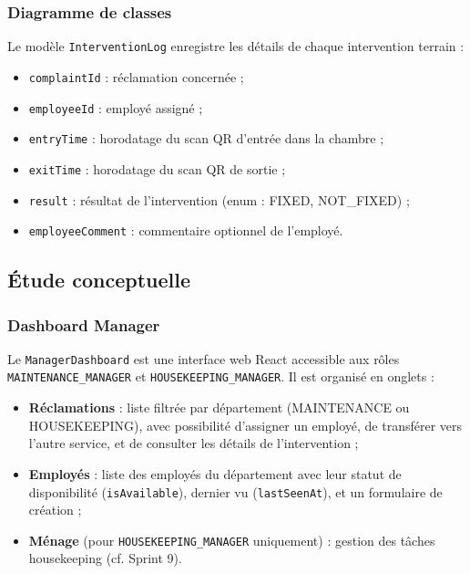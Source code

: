\subsubsection{Diagramme de classes}


Le modèle \texttt{InterventionLog} enregistre les détails de chaque intervention terrain :
\begin{itemize}
  \item \texttt{complaintId} : réclamation concernée ;
  \item \texttt{employeeId} : employé assigné ;
  \item \texttt{entryTime} : horodatage du scan QR d'entrée dans la chambre ;
  \item \texttt{exitTime} : horodatage du scan QR de sortie ;
  \item \texttt{result} : résultat de l'intervention (enum : FIXED, NOT\_FIXED) ;
  \item \texttt{employeeComment} : commentaire optionnel de l'employé.
\end{itemize}

\subsection{Étude conceptuelle}

\subsubsection{Dashboard Manager}

Le \texttt{ManagerDashboard} est une interface web React accessible aux rôles \texttt{MAINTENANCE\_MANAGER} et \texttt{HOUSEKEEPING\_MANAGER}. Il est organisé en onglets :
\begin{itemize}
  \item \textbf{Réclamations} : liste filtrée par département (MAINTENANCE ou HOUSEKEEPING), avec possibilité d'assigner un employé, de transférer vers l'autre service, et de consulter les détails de l'intervention ;
  \item \textbf{Employés} : liste des employés du département avec leur statut de disponibilité (\texttt{isAvailable}), dernier vu (\texttt{lastSeenAt}), et un formulaire de création ;
  \item \textbf{Ménage} (pour \texttt{HOUSEKEEPING\_MANAGER} uniquement) : gestion des tâches housekeeping (cf. Sprint 9).
\end{itemize}

